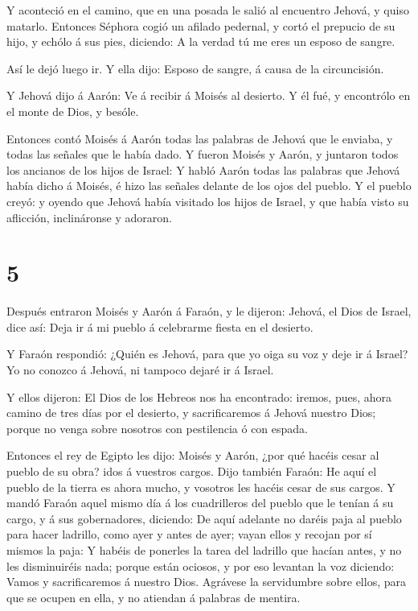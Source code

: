  Y aconteció en el camino, que en una posada le salió al
encuentro Jehová, y quiso matarlo.  Entonces Séphora cogió
un afilado pedernal, y cortó el prepucio de su hijo, y echólo á sus
pies, diciendo: A la verdad tú me eres un esposo de sangre.

 Así le dejó luego ir. Y ella dijo: Esposo de sangre, á
causa de la circuncisión.

 Y Jehová dijo á Aarón: Ve á recibir á Moisés al desierto.
Y él fué, y encontrólo en el monte de Dios, y besóle.

 Entonces contó Moisés á Aarón todas las palabras de Jehová
que le enviaba, y todas las señales que le había dado.  Y
fueron Moisés y Aarón, y juntaron todos los ancianos de los hijos de
Israel:  Y habló Aarón todas las palabras que Jehová había
dicho á Moisés, é hizo las señales delante de los ojos del pueblo.
 Y el pueblo creyó: y oyendo que Jehová había visitado los
hijos de Israel, y que había visto su aflicción, inclináronse y
adoraron.

\hypertarget{section-4}{%
\section{5}\label{section-4}}

 Después entraron Moisés y Aarón á Faraón, y le dijeron:
Jehová, el Dios de Israel, dice así: Deja ir á mi pueblo á celebrarme
fiesta en el desierto.

 Y Faraón respondió: ¿Quién es Jehová, para que yo oiga su
voz y deje ir á Israel? Yo no conozco á Jehová, ni tampoco dejaré ir á
Israel.

 Y ellos dijeron: El Dios de los Hebreos nos ha encontrado:
iremos, pues, ahora camino de tres días por el desierto, y
sacrificaremos á Jehová nuestro Dios; porque no venga sobre nosotros con
pestilencia ó con espada.

 Entonces el rey de Egipto les dijo: Moisés y Aarón, ¿por
qué hacéis cesar al pueblo de su obra? idos á vuestros cargos.
 Dijo también Faraón: He aquí el pueblo de la tierra es
ahora mucho, y vosotros les hacéis cesar de sus cargos.  Y
mandó Faraón aquel mismo día á los cuadrilleros del pueblo que le tenían
á su cargo, y á sus gobernadores, diciendo:  De aquí
adelante no daréis paja al pueblo para hacer ladrillo, como ayer y antes
de ayer; vayan ellos y recojan por sí mismos la paja:  Y
habéis de ponerles la tarea del ladrillo que hacían antes, y no les
disminuiréis nada; porque están ociosos, y por eso levantan la voz
diciendo: Vamos y sacrificaremos á nuestro Dios.  Agrávese
la servidumbre sobre ellos, para que se ocupen en ella, y no atiendan á
palabras de mentira.

